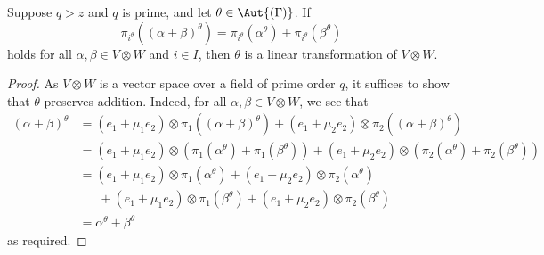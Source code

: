 \begin{lemma} \label{lm:automorphism-linear-sufficiency}
Suppose $q > z$ and $q$ is prime, and let $\theta \in \Aut{\left(\Gamma \right)}$. If
\begin{displaymath}
    \pi_{i^\theta}{\left(\left(\alpha + \beta \right)^\theta \right)} = \pi_{i^\theta}{\left(\alpha^\theta \right)} + \pi_{i^\theta}{\left(\beta^\theta \right)}
\end{displaymath}
holds for all $\alpha, \beta \in V \otimes W$ and $i \in I$, then $\theta$ is a linear transformation of $V \otimes W$.
\end{lemma}
\begin{proof}
As $V \otimes W$ is a vector space over a field of prime order $q$, it suffices to show that $\theta$ preserves addition. Indeed, for all $\alpha, \beta \in V \otimes W$, we see that
\begin{align*}
    \left(\alpha + \beta \right)^\theta &= \left(e_1 + \mu_1 e_2 \right) \otimes \pi_1{\left(\left(\alpha + \beta \right)^\theta \right)} + \left(e_1 + \mu_2 e_2 \right) \otimes \pi_2{\left(\left(\alpha + \beta \right)^\theta \right)} \\
    &= \left(e_1 + \mu_1 e_2 \right) \otimes \left(\pi_1{\left(\alpha^\theta \right)} + \pi_1{\left(\beta^\theta \right)}\right) + \left(e_1 + \mu_2 e_2 \right) \otimes \left(\pi_2{\left(\alpha^\theta \right)} + \pi_2{\left(\beta^\theta \right)}\right) \\
    &= \left(e_1 + \mu_1 e_2 \right) \otimes \pi_1{\left(\alpha^\theta \right)} + \left(e_1 + \mu_2 e_2 \right) \otimes \pi_2{\left(\alpha^\theta \right)} \\
    &\ \ \ \ \ \ \ + \left(e_1 + \mu_1 e_2 \right) \otimes \pi_1{\left(\beta^\theta \right)} + \left(e_1 + \mu_2 e_2 \right) \otimes \pi_2{\left(\beta^\theta \right)} \\
    &= \alpha^\theta + \beta^\theta
\end{align*}
as required.
\end{proof}

